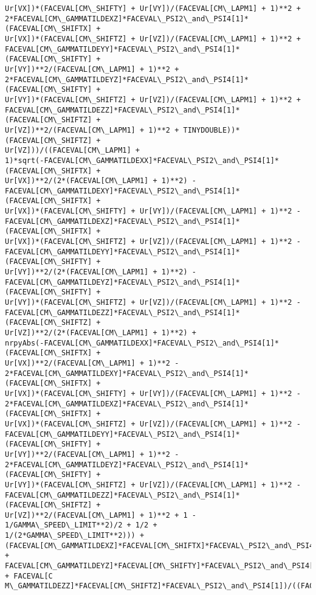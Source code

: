 \documentclass[landscape,letterpaper,10pt,english]{article}
\begin{document}
\begin{Verbatim}[commandchars=\\\{\}]
Ur[VX])*(FACEVAL[CM\_SHIFTY] + Ur[VY])/(FACEVAL[CM\_LAPM1] + 1)**2 +
2*FACEVAL[CM\_GAMMATILDEXZ]*FACEVAL\_PSI2\_and\_PSI4[1]*(FACEVAL[CM\_SHIFTX] +
Ur[VX])*(FACEVAL[CM\_SHIFTZ] + Ur[VZ])/(FACEVAL[CM\_LAPM1] + 1)**2 +
FACEVAL[CM\_GAMMATILDEYY]*FACEVAL\_PSI2\_and\_PSI4[1]*(FACEVAL[CM\_SHIFTY] +
Ur[VY])**2/(FACEVAL[CM\_LAPM1] + 1)**2 +
2*FACEVAL[CM\_GAMMATILDEYZ]*FACEVAL\_PSI2\_and\_PSI4[1]*(FACEVAL[CM\_SHIFTY] +
Ur[VY])*(FACEVAL[CM\_SHIFTZ] + Ur[VZ])/(FACEVAL[CM\_LAPM1] + 1)**2 +
FACEVAL[CM\_GAMMATILDEZZ]*FACEVAL\_PSI2\_and\_PSI4[1]*(FACEVAL[CM\_SHIFTZ] +
Ur[VZ])**2/(FACEVAL[CM\_LAPM1] + 1)**2 + TINYDOUBLE))*(FACEVAL[CM\_SHIFTZ] +
Ur[VZ]))/((FACEVAL[CM\_LAPM1] +
1)*sqrt(-FACEVAL[CM\_GAMMATILDEXX]*FACEVAL\_PSI2\_and\_PSI4[1]*(FACEVAL[CM\_SHIFTX] +
Ur[VX])**2/(2*(FACEVAL[CM\_LAPM1] + 1)**2) -
FACEVAL[CM\_GAMMATILDEXY]*FACEVAL\_PSI2\_and\_PSI4[1]*(FACEVAL[CM\_SHIFTX] +
Ur[VX])*(FACEVAL[CM\_SHIFTY] + Ur[VY])/(FACEVAL[CM\_LAPM1] + 1)**2 -
FACEVAL[CM\_GAMMATILDEXZ]*FACEVAL\_PSI2\_and\_PSI4[1]*(FACEVAL[CM\_SHIFTX] +
Ur[VX])*(FACEVAL[CM\_SHIFTZ] + Ur[VZ])/(FACEVAL[CM\_LAPM1] + 1)**2 -
FACEVAL[CM\_GAMMATILDEYY]*FACEVAL\_PSI2\_and\_PSI4[1]*(FACEVAL[CM\_SHIFTY] +
Ur[VY])**2/(2*(FACEVAL[CM\_LAPM1] + 1)**2) -
FACEVAL[CM\_GAMMATILDEYZ]*FACEVAL\_PSI2\_and\_PSI4[1]*(FACEVAL[CM\_SHIFTY] +
Ur[VY])*(FACEVAL[CM\_SHIFTZ] + Ur[VZ])/(FACEVAL[CM\_LAPM1] + 1)**2 -
FACEVAL[CM\_GAMMATILDEZZ]*FACEVAL\_PSI2\_and\_PSI4[1]*(FACEVAL[CM\_SHIFTZ] +
Ur[VZ])**2/(2*(FACEVAL[CM\_LAPM1] + 1)**2) +
nrpyAbs(-FACEVAL[CM\_GAMMATILDEXX]*FACEVAL\_PSI2\_and\_PSI4[1]*(FACEVAL[CM\_SHIFTX] +
Ur[VX])**2/(FACEVAL[CM\_LAPM1] + 1)**2 -
2*FACEVAL[CM\_GAMMATILDEXY]*FACEVAL\_PSI2\_and\_PSI4[1]*(FACEVAL[CM\_SHIFTX] +
Ur[VX])*(FACEVAL[CM\_SHIFTY] + Ur[VY])/(FACEVAL[CM\_LAPM1] + 1)**2 -
2*FACEVAL[CM\_GAMMATILDEXZ]*FACEVAL\_PSI2\_and\_PSI4[1]*(FACEVAL[CM\_SHIFTX] +
Ur[VX])*(FACEVAL[CM\_SHIFTZ] + Ur[VZ])/(FACEVAL[CM\_LAPM1] + 1)**2 -
FACEVAL[CM\_GAMMATILDEYY]*FACEVAL\_PSI2\_and\_PSI4[1]*(FACEVAL[CM\_SHIFTY] +
Ur[VY])**2/(FACEVAL[CM\_LAPM1] + 1)**2 -
2*FACEVAL[CM\_GAMMATILDEYZ]*FACEVAL\_PSI2\_and\_PSI4[1]*(FACEVAL[CM\_SHIFTY] +
Ur[VY])*(FACEVAL[CM\_SHIFTZ] + Ur[VZ])/(FACEVAL[CM\_LAPM1] + 1)**2 -
FACEVAL[CM\_GAMMATILDEZZ]*FACEVAL\_PSI2\_and\_PSI4[1]*(FACEVAL[CM\_SHIFTZ] +
Ur[VZ])**2/(FACEVAL[CM\_LAPM1] + 1)**2 + 1 - 1/GAMMA\_SPEED\_LIMIT**2)/2 + 1/2 +
1/(2*GAMMA\_SPEED\_LIMIT**2))) +
(FACEVAL[CM\_GAMMATILDEXZ]*FACEVAL[CM\_SHIFTX]*FACEVAL\_PSI2\_and\_PSI4[1] +
FACEVAL[CM\_GAMMATILDEYZ]*FACEVAL[CM\_SHIFTY]*FACEVAL\_PSI2\_and\_PSI4[1] + FACEVAL[C
M\_GAMMATILDEZZ]*FACEVAL[CM\_SHIFTZ]*FACEVAL\_PSI2\_and\_PSI4[1])/((FACEVAL[CM\_LAPM1]

\end{Verbatim}
\end{document}
